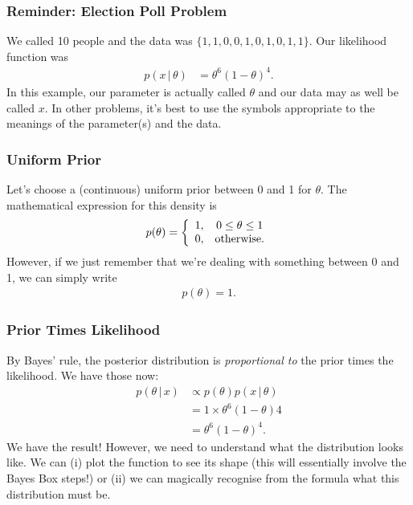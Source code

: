 \documentclass{beamer}
\newcommand{\given}{\,|\,}
\begin{document}
\begin{frame}
\frametitle{Reminder: Election Poll Problem}
We called 10 people and the data was
$\{1, 1, 0, 0, 1, 0, 1, 0, 1, 1\}$. Our likelihood function was
\begin{align}
p(x \given \theta) &= \theta^6(1-\theta)^4.
\end{align}
\pause
In this example, our parameter is actually called $\theta$ and our data may
as well be called $x$. In other problems, it's best to use the symbols
appropriate to the meanings of the parameter(s) and the data.
\end{frame}


\begin{frame}
\frametitle{Uniform Prior}
Let's choose a (continuous) uniform prior between 0 and 1 for $\theta$.
The mathematical expression for this density is
\begin{align}
p(\theta) = \left\{
                \begin{array}{cc}
                1, & 0 \leq \theta \leq 1 \\
                0, & \textnormal{otherwise}.
                \end{array}
            \right.
\end{align}
\pause
However, if we just remember that we're dealing with something between 0 and 1,
we can simply write
\begin{align}
p(\theta) = 1.
\end{align}

\end{frame}

\begin{frame}
\frametitle{Prior Times Likelihood}
By Bayes' rule, the posterior distribution is {\em proportional to}
the prior times the likelihood. We have those now:
\begin{align}
p(\theta \given x) &\propto p(\theta) p(x \given \theta) \\
                   &= 1 \times \theta^6(1-\theta)4 \\
                   &= \theta^6(1-\theta)^4.
\end{align}
\pause
We have the result! However, we need to understand what the distribution
looks like. We can (i) plot the function to see its shape (this will essentially
involve the Bayes Box steps!) or (ii) we can magically recognise from the
formula what this distribution must be.

\end{frame}
\end{document}
